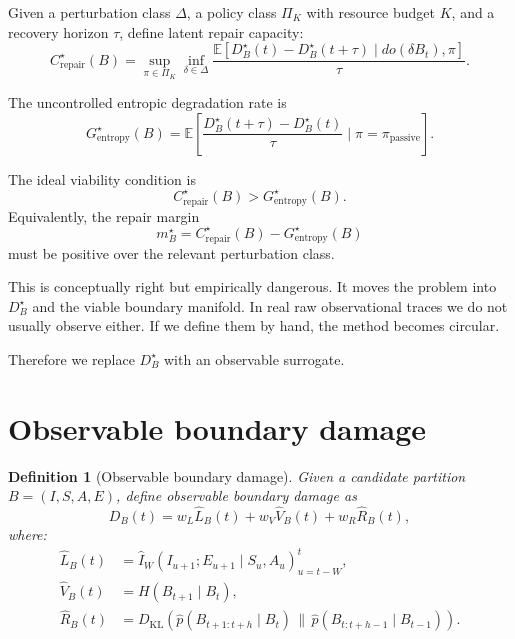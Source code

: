 \documentclass[11pt]{article}
\newtheorem{definition}{Definition}
\newcommand{\E}{\mathbb{E}}
\newcommand{\MI}{I}
\newcommand{\KL}{D_{\mathrm{KL}}}
\newcommand{\given}{\mid}
\begin{document}
Given a perturbation class $\Delta$, a policy class $\Pi_K$ with resource budget $K$, and a recovery horizon $\tau$, define latent repair capacity:
\begin{equation}
  C_{\mathrm{repair}}^\star(B)
  =
  \sup_{\pi\in\Pi_K}
  \inf_{\delta\in\Delta}
  \frac{
    \E\left[
      D_B^\star(t)-D_B^\star(t+\tau)
      \given
      do(\delta B_t),\pi
    \right]
  }{\tau}.
  \label{eq:latent-repair}
\end{equation}

The uncontrolled entropic degradation rate is
\begin{equation}
  G_{\mathrm{entropy}}^\star(B)
  =
  \E\left[
    \frac{D_B^\star(t+\tau)-D_B^\star(t)}{\tau}
    \given
    \pi=\pi_{\mathrm{passive}}
  \right].
  \label{eq:entropy-rate}
\end{equation}

The ideal viability condition is
\begin{equation}
  C_{\mathrm{repair}}^\star(B) > G_{\mathrm{entropy}}^\star(B).
  \label{eq:repair-margin}
\end{equation}
Equivalently, the repair margin
\begin{equation}
  m_B^\star = C_{\mathrm{repair}}^\star(B)-G_{\mathrm{entropy}}^\star(B)
\end{equation}
must be positive over the relevant perturbation class.

This is conceptually right but empirically dangerous. It moves the problem into $D_B^\star$ and the viable boundary manifold. In real raw observational traces we do not usually observe either. If we define them by hand, the method becomes circular.

Therefore we replace $D_B^\star$ with an observable surrogate.

\section{Observable boundary damage}

\begin{definition}[Observable boundary damage]
Given a candidate partition $B=(I,S,A,E)$, define observable boundary damage as
\begin{equation}
  D_B(t)
  =
  w_L \widehat{L}_B(t)
  +
  w_V \widehat{V}_B(t)
  +
  w_R \widehat{R}_B(t),
  \label{eq:damage}
\end{equation}
where:
\begin{align}
  \widehat{L}_B(t)
  &=
  \widehat{\MI}_{W}
  \left(
    I_{u+1};E_{u+1}
    \given
    S_u,A_u
  \right)_{u=t-W}^{t},
  \label{eq:rolling-leakage}
  \\
  \widehat{V}_B(t)
  &=
  H(B_{t+1}\given B_t),
  \label{eq:volatility}
  \\
  \widehat{R}_B(t)
  &=
  \KL\left(
    \widehat{p}(B_{t+1:t+h}\given B_t)
    \,\|\, 
    \widehat{p}(B_{t:t+h-1}\given B_{t-1})
  \right).
  \label{eq:drift}
\end{align}
\end{definition}
\end{document}
